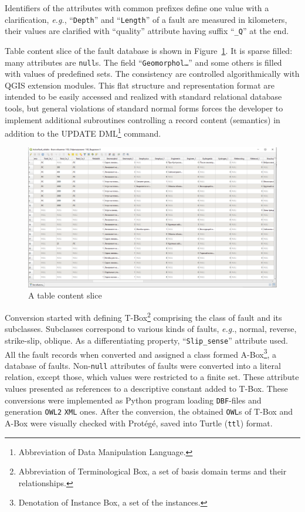 \documentclass[
]{ceurart}
\begin{document}
  Identifiers of the attributes with common prefixes define one value with a clarification, \emph{e.g.}, ``\texttt{Depth}'' and ``\texttt{Length}'' of a fault are measured in kilometers, their values are clarified with ``quality'' attribute having suffix ``\texttt{\_Q}'' at the end.

  Table content slice of the fault database is shown in Figure~\ref{fig:db-slice}.  It is sparse filled: many attributes are \texttt{null}s.  The field ``\texttt{Geomorphol\ldots}'' and some others is filled with values of predefined sets.  The consistency are controlled algorithmically with QGIS extension modules.  This flat structure and representation format are intended to be easily accessed and realized with standard relational database tools, but general violations of standard normal forms forces the developer to implement additional subroutines controlling a record content (semantics) in addition to the UPDATE DML\footnote{Abbreviation of Data Manipulation Language.} command.

  \begin{figure}
    \centering
\includegraphics[width=\linewidth]{faults-leaflet-db-content.png}
    \caption{A table content slice}
    \label{fig:db-slice}
  \end{figure}

Conversion started with defining T-Box\footnote{Abbreviation of Terminological Box, a set of basis domain terms and their relationships.} comprising the class of fault and its subclasses.  Subclasses correspond to various kinds of faults, \emph{e.g.}, normal, reverse, strike-slip, oblique.  As a differentiating property, ``\texttt{Slip\_sense}'' attribute used.  All the fault records when converted and assigned a class formed A-Box\footnote{Denotation of Instance Box, a set of the instances.}, a database of faults.  Non-\texttt{null} attributes of faults were converted into a literal relation, except those, which values were restricted to a finite set.  These attribute values presented as references to a descriptive constant added to T-Box.  These conversions were implemented as Python program loading \texttt{DBF}-files and generation \texttt{OWL2} \texttt{XML} ones.  After the conversion, the obtained \texttt{OWL}s of T-Box and A-Box were visually checked with Protégé, saved into Turtle (\texttt{ttl}) format.
\end{document}
